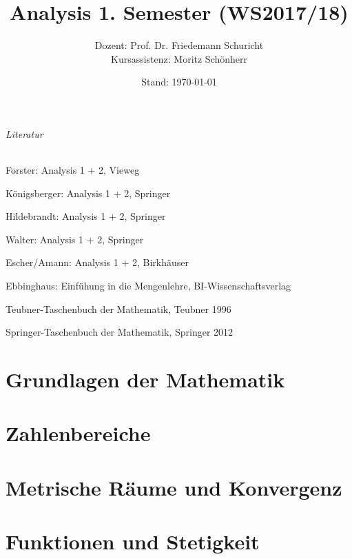 \documentclass[11pt]{book}
\theoremstyle{break}
\theoremstyle{break}
\begin{document}
\title{\textbf{Analysis 1. Semester (WS2017/18)}}
\author{Dozent: Prof. Dr. Friedemann Schuricht\\
	Kursassistenz: Moritz Schönherr}
\date{Stand: \today}

\frontmatter
\maketitle
\tableofcontents

\newpage
\paragraph{Literatur}
\begin{compactitem}
	\item Forster: Analysis 1 + 2, Vieweg
	\item Königsberger: Analysis 1 + 2, Springer
	\item Hildebrandt: Analysis 1 + 2, Springer
	\item Walter: Analysis 1 + 2, Springer
	\item Escher/Amann: Analysis 1 + 2, Birkhäuser
	\item Ebbinghaus: Einfühung in die Mengenlehre, BI-Wissenschaftsverlag
	\item Teubner-Taschenbuch der Mathematik, Teubner 1996
	\item Springer-Taschenbuch der Mathematik, Springer 2012
\end{compactitem}

\mainmatter
\part{Grundlagen der Mathematik}


\part{Zahlenbereiche}




\part{Metrische Räume und Konvergenz}






\part{Funktionen und Stetigkeit}


\backmatter
\end{document}
